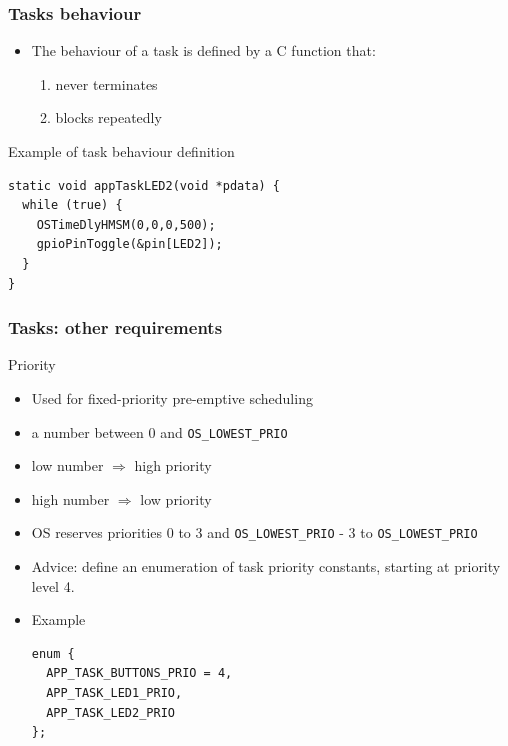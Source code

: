 \documentclass[hyperref={pdfpagelabels=false},svgnames]{beamer}
\begin{document}
\begin{frame}[fragile]
\frametitle{Tasks behaviour}
\begin{itemize}
\item The behaviour of a task is defined by a C function that:
\begin{enumerate}
\item never terminates
\item blocks repeatedly
\end{enumerate}
\end{itemize}

\begin{block}{Example of task behaviour definition}

\begin{lstlisting}
static void appTaskLED2(void *pdata) {
  while (true) {                
    OSTimeDlyHMSM(0,0,0,500);   
    gpioPinToggle(&pin[LED2]);
  } 
}
\end{lstlisting}

\end{block}
\end{frame}


\begin{frame}[fragile]
\frametitle{Tasks: other requirements}
\begin{block}{Priority}
\begin{itemize}
\item Used for fixed-\alert{priority} pre-emptive scheduling
\item a number between 0 and \verb'OS_LOWEST_PRIO'
\item \alert{low} number $\Rightarrow$ \alert{high} priority
\item \alert{high} number $\Rightarrow$ \alert{low} priority
\item OS reserves priorities 0 to 3 and \verb'OS_LOWEST_PRIO' - 3 to \verb'OS_LOWEST_PRIO'
\item Advice: define an enumeration of task priority constants, starting at
priority level 4.
\item Example
\begin{lstlisting}
enum {
  APP_TASK_BUTTONS_PRIO = 4,
  APP_TASK_LED1_PRIO,
  APP_TASK_LED2_PRIO
};
\end{lstlisting}
\end{itemize}
\end{block}
\end{frame}
\end{document}
